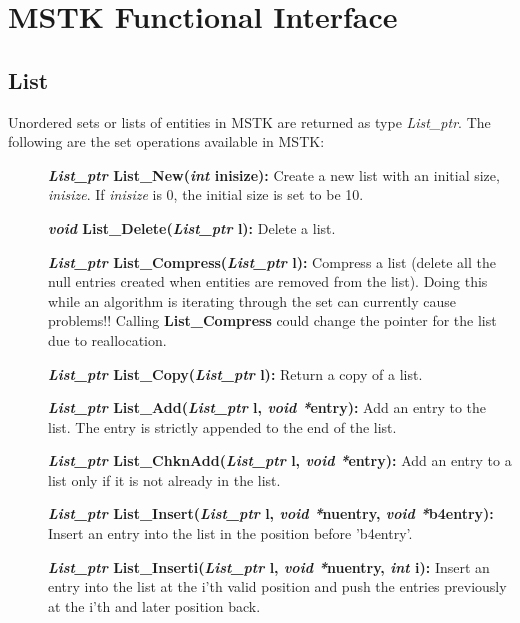 \documentclass[12pt]{article}
\begin{document}
\newpage
\section{MSTK Functional Interface}
\subsection{List}

Unordered sets or lists of entities in MSTK are returned as type
{\em List\_ptr}. The following are the set operations available in
MSTK:

\begin{description}
\item[]{\bf {\em List\_ptr} List\_New({\em int} inisize):} Create a
new list with an initial size, {\em inisize}. If {\em inisize} is
0, the initial size is set to be 10.

\item[]{\bf {\em void} List\_Delete({\em List\_ptr} l):} Delete a list.
  
\item[]{\bf {\em List\_ptr} List\_Compress({\em List\_ptr}
    l):} Compress a list (delete all the null entries created when
  entities are removed from the list).  Doing this while an algorithm
  is iterating through the set can currently cause problems!! Calling
  {\bf List\_Compress} could change the pointer for the list due to
  reallocation.

\item[]{\bf {\em List\_ptr} List\_Copy({\em List\_ptr} l):} Return a
copy of a list.

\item[]{\bf {\em List\_ptr} List\_Add({\em List\_ptr} l, {\em void
  *}entry):} Add an entry to the list. The entry is strictly appended to the end
of the list.

\item[]{\bf {\em List\_ptr} List\_ChknAdd({\em List\_ptr} l,
{\em void *}entry):} Add an entry to a list only if it is not already
in the list.

\item[]{\bf {\em List\_ptr} List\_Insert({\em List\_ptr} l,
{\em void *}nuentry, {\em void *}b4entry):} Insert an entry into the list in the position before 'b4entry'.

\item[]{\bf {\em List\_ptr} List\_Inserti({\em List\_ptr} l,
    {\em void *}nuentry, {\em int} i):} Insert an entry into the
  list at the i'th valid position and push the entries previously at
  the i'th and later position back.


\end{description}
\end{document}
